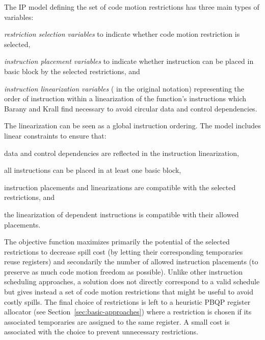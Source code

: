 \documentclass[acmsmall,authorversion,nonacm]{acmart}
\newcommand{\var}[2]{}
\begin{document}
The IP model defining the set of code motion restrictions has three
main types of variables:
\begin{inparaitem}[]
\item \emph{restriction selection variables} \var{select}{r} to
  indicate whether code motion restriction  is selected,
\item \emph{instruction placement variables} \var{place}{i,b} to
  indicate whether instruction  can be placed in basic block  by
  the selected restrictions, and
\item \emph{instruction linearization variables} \var{s}{i}
  (\var{instr}{i} in the original notation) representing the order of
  instruction  within a linearization of the function's
  instructions which Barany and Krall find necessary to avoid circular
  data and control dependencies.
\end{inparaitem}
The linearization can be seen as a global instruction ordering.
The model includes linear constraints to ensure that:
\begin{inparaitem}[]
\item data and control dependencies are reflected in the instruction
  linearization,
\item all instructions can be placed in at least one basic block,
\item instruction placements and linearizations are compatible with
  the selected restrictions, and
\item the linearization of dependent instructions is compatible with
  their allowed placements.
\end{inparaitem}
The objective function maximizes primarily the potential of the
selected restrictions to decrease spill cost (by letting their
corresponding temporaries reuse registers) and secondarily the number
of allowed instruction placements (to preserve as much code motion
freedom as possible).
Unlike other instruction scheduling approaches, a solution does not
directly correspond to a valid schedule but gives instead a set of
code motion restrictions that might be useful to avoid costly spills.
The final choice of restrictions is left to a heuristic PBQP register
allocator (see Section~\ref{sec:basic-approaches}) where a restriction
is chosen if its associated temporaries are assigned to the same
register.
A small cost is associated with the choice to prevent unnecessary
restrictions.
\end{document}
